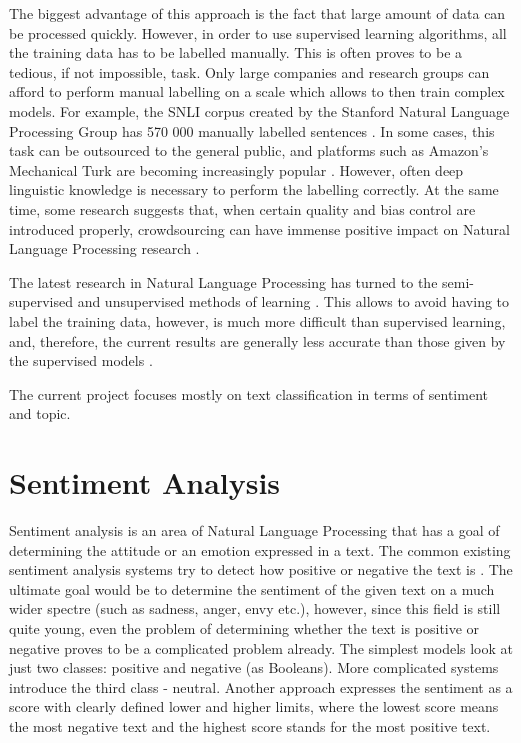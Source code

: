 The biggest advantage of this approach is the fact that large amount of data can be processed quickly. However, in order to use supervised learning algorithms, all the training data has to be labelled manually. This is often proves to be a tedious, if not impossible, task. Only large companies and research groups can afford to perform manual labelling on a scale which allows to then train complex models. For example, the SNLI corpus created by the Stanford Natural Language Processing Group has 570 000 manually labelled sentences \cite{ferrero2017compilig}. In some cases, this task can be outsourced to the general public, and platforms such as Amazon's Mechanical Turk are becoming increasingly popular \cite{callison2010creating}. However, often deep linguistic knowledge is necessary to perform the labelling correctly. At the same time, some research suggests that, when certain quality and bias control are introduced properly, crowdsourcing can have immense positive impact on Natural Language Processing research \cite{sabou2012crowdsourcing, snow2008cheap}.

The latest research in Natural Language Processing has turned to the semi-supervised and unsupervised methods of learning \cite{liang2005semi, turian2010word}. This allows to avoid having to label the training data, however, is much more difficult than supervised learning, and, therefore, the current results are generally less accurate than those given by the supervised models \cite{lapata2005web}.

The current project focuses mostly on text classification in terms of sentiment and topic. 

\section{Sentiment Analysis}
\label{sec:sentiment_analysis}

Sentiment analysis is an area of Natural Language Processing that has a goal of determining the attitude or an emotion expressed in a text. The common existing sentiment analysis systems try to detect how positive or negative the text is \cite{yi2003sentiment}. The ultimate goal would be to determine the sentiment of the given text on a much wider spectre (such as sadness, anger, envy etc.), however, since this field is still quite young, even the problem of determining whether the text is positive or negative proves to be a complicated problem already. The simplest models look at just two classes: positive and negative (as Booleans). More complicated systems introduce the third class - neutral. Another approach expresses the sentiment as a score with clearly defined lower and higher limits, where the lowest score means the most negative text and the highest score stands for the most positive text.

